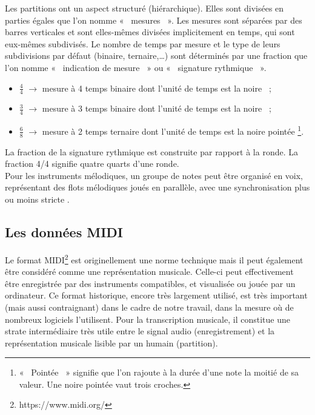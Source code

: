 Les partitions ont un aspect structuré (hiérarchique). Elles sont divisées en
parties égales que l’on nomme «~ mesures~ ». Les mesures sont séparées par des
barres verticales et sont elles-mêmes divisées implicitement en temps, qui sont
eux-mêmes subdivisés. Le nombre de temps par mesure et le type de leurs
subdivisions par défaut (binaire, ternaire,…) sont déterminés par une fraction
que l’on nomme «~ indication de mesure~ » ou «~ signature rythmique~ ».\\

\begin{itemize}
    \item $\frac{4}{4}$ $\to$ mesure à 4 temps binaire dont l’unité de temps
        est la noire~ ;\\
    \item $\frac{3}{4}$ $\to$ mesure à 3 temps binaire dont l’unité de temps
        est la noire~ ;\\
    \item $\frac{6}{8}$ $\to$ mesure à 2 temps ternaire dont l’unité de temps
        est la noire pointée \footnote{«~ Pointée~ » signifie que l’on rajoute à
        la durée d’une note la moitié de sa valeur. Une noire pointée vaut
    trois croches.}.\\
\end{itemize}

La fraction de la signature rythmique est construite par rapport à la ronde.
La fraction 4/4 signifie quatre quarts d’une ronde.\\

Pour les instruments mélodiques, un groupe de notes peut être organisé en
voix, représentant des flots mélodiques joués en parallèle, avec une
synchronisation plus ou moins stricte \cite{shibata} \cite{
Guiomard-Kagan}.

\subsection*{Les données MIDI}
Le format MIDI\footnote{https://www.midi.org/} est originellement une norme
technique mais il peut également être considéré comme une représentation
musicale. Celle-ci peut effectivement être enregistrée par des instruments
compatibles, et visualisée ou jouée par un ordinateur. Ce format historique,
encore très largement utilisé, est très important (mais aussi contraignant)
dans le cadre de notre travail, dans la mesure où de nombreux logiciels
l’utilisent. Pour la transcription musicale, il constitue une strate
intermédiaire très utile entre le signal audio (enregistrement) et la
représentation musicale lisible par un humain (partition).

